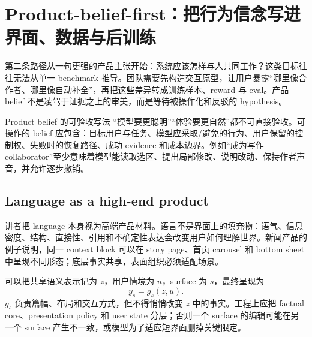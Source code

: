 \section{Product-belief-first：把行为信念写进界面、数据与后训练}

第二条路径从一句更强的产品主张开始：系统应该怎样与人共同工作？这类目标往往无法从单一 benchmark 推导。团队需要先构造交互原型，让用户暴露“哪里像合作者、哪里像自动补全”，再把这些差异转成训练样本、reward 与 eval。产品 belief 不是凌驾于证据之上的审美，而是等待被操作化和反驳的 hypothesis。


\begin{importantbox}{Product belief 的可验收写法}
“模型要更聪明”“体验要更自然”都不可直接验收。可操作的 belief 应包含：目标用户与任务、模型应采取/避免的行为、用户保留的控制权、失败时的恢复路径、成功 evidence 和成本边界。例如“成为写作 collaborator”至少意味着模型能读取选区、提出局部修改、说明改动、保持作者声音，并允许逐步撤销。
\end{importantbox}

\subsection{Language as a high-end product}

讲者把 language 本身视为高端产品材料。语言不是界面上的填充物：语气、信息密度、结构、直接性、引用和不确定性表达会改变用户如何理解世界。新闻产品的例子说明，同一 context block 可以在 story page、首页 carousel 和 bottom sheet 中呈现不同形态；底层事实共享，表面组织必须适配场景。




可以把共享语义表示记为 $z$，用户情境为 $u$，surface 为 $s$，最终呈现为
\[
y_s=g_s(z,u).
\]
$g_s$ 负责篇幅、布局和交互方式，但不得悄悄改变 $z$ 中的事实。工程上应把 factual core、presentation policy 和 user state 分层；否则一个 surface 的编辑可能在另一个 surface 产生不一致，或模型为了适应短界面删掉关键限定。

